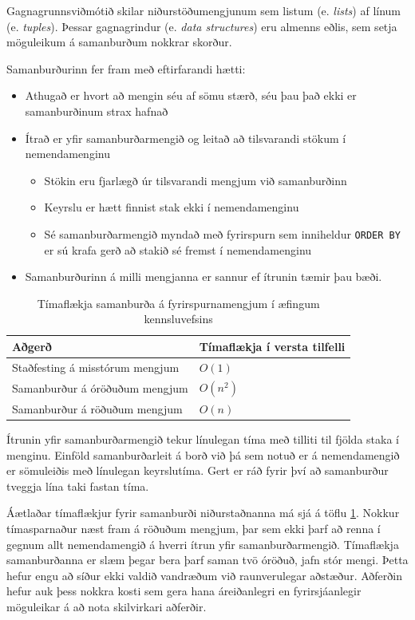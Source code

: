 \documentclass[a4paper,12pt,twoside,BCOR=10mm]{scrbook}
\begin{document}
Gagnagrunnsviðmótið skilar niðurstöðumengjunum sem listum (e. \emph{lists}) af línum (e. \emph{tuples}). Þessar gagnagrindur (e. \emph{data structures}) eru almenns eðlis, sem setja möguleikum á samanburðum nokkrar skorður.

Samanburðurinn fer fram með eftirfarandi hætti:
\begin{itemize}
 \item Athugað er hvort að mengin séu af sömu stærð, séu þau það ekki er samanburðinum strax hafnað
 \item Ítrað er yfir samanburðarmengið og leitað að tilsvarandi stökum í nemendamenginu
 \begin{itemize}
  \item Stökin eru fjarlægð úr tilsvarandi mengjum við samanburðinn
  \item Keyrslu er hætt finnist stak ekki í nemendamenginu
  \item Sé samanburðarmengið myndað með fyrirspurn sem inniheldur \texttt{ORDER BY} er sú krafa gerð að stakið sé fremst í nemendamenginu
 \end{itemize}
 \item Samanburðurinn á milli mengjanna er sannur ef ítrunin tæmir þau bæði.
\end{itemize}

\begin{table}
\caption[Tímaflækja samanburða]{Tímaflækja samanburða á fyrirspurnamengjum í æfingum kennsluvefsins}
\label{tab:comparison-complexity}
\begin{center}
\begin{tabular}{ll}
\toprule
Aðgerð&Tímaflækja í versta tilfelli\\
\midrule
Staðfesting á misstórum mengjum& $O(1)$\\
Samanburður á óröðuðum mengjum& $O(n^2)$\\
Samanburður á röðuðum mengjum& $O(n)$\\
\bottomrule
\end{tabular}
\end{center}
\end{table}
Ítrunin yfir samanburðarmengið tekur línulegan tíma með tilliti til fjölda staka í menginu. Einföld samanburðarleit á borð við þá sem notuð er á nemendamengið er sömuleiðis með línulegan keyrslutíma. Gert er ráð fyrir því að samanburður tveggja lína taki fastan tíma.

Áætlaðar tímaflækjur fyrir samanburði niðurstaðnanna má sjá á töflu \ref{tab:comparison-complexity}. Nokkur tímasparnaður næst fram á röðuðum mengjum, þar sem ekki þarf að renna í gegnum allt nemendamengið á hverri ítrun yfir samanburðarmengið. Tímaflækja samanburðanna er slæm þegar bera þarf saman tvö óröðuð, jafn stór mengi. Þetta hefur engu að síður ekki valdið vandræðum við raunverulegar aðstæður. Aðferðin hefur auk þess nokkra kosti sem gera hana áreiðanlegri en fyrirsjáanlegir möguleikar á að nota skilvirkari aðferðir.
\end{document}
